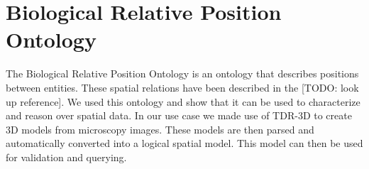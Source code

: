 \section{Biological Relative Position Ontology}

The Biological Relative Position
Ontology
is an ontology that describes positions between
entities. These spatial relations have been described in the [TODO:
  look up reference]. We used this ontology and show that it can be
used to characterize and reason over spatial data. In our use case we
made use of TDR-3D to create 3D models from microscopy images. These
models are then parsed and automatically converted into a logical
spatial model. This model can then be used for validation and
querying.
